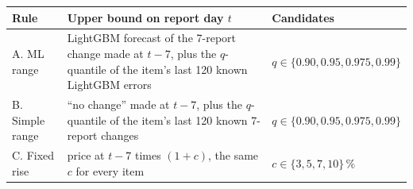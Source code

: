 \begin{tabularx}{\linewidth}{lXl}
\toprule
\textbf{Rule} & \textbf{Upper bound on report day $t$} & \textbf{Candidates} \\
\midrule
A. ML range & LightGBM forecast of the 7-report change made at $t-7$, plus the $q$-quantile of the item's last 120 known LightGBM errors & $q \in \{0.90, 0.95, 0.975, 0.99\}$ \\
B. Simple range & ``no change'' made at $t-7$, plus the $q$-quantile of the item's last 120 known 7-report changes & $q \in \{0.90, 0.95, 0.975, 0.99\}$ \\
C. Fixed rise & price at $t-7$ times $(1+c)$, the same $c$ for every item & $c \in \{3, 5, 7, 10\}\,\%$ \\
\bottomrule
\end{tabularx}
